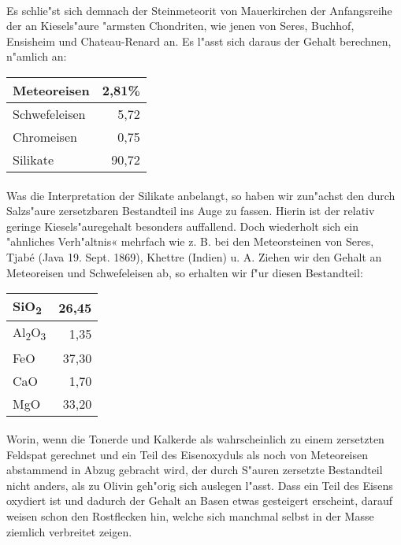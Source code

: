 \documentclass[a4paper, 11pt, oneside]{article}
\begin{document}
\paragraph{}
Es schlie"st sich demnach der Steinmeteorit von Mauerkirchen der Anfangsreihe der an Kiesels"aure "armsten Chondriten, wie jenen von Seres, Buchhof, Ensisheim und Chateau-Renard an. Es l"asst sich daraus der Gehalt berechnen, n"amlich an:
\begin{center}
    \begin{tabular}{ |l|r| } 
    \hline
    Meteoreisen & 2,81\%\\\hline
    Schwefeleisen & 5,72\\\hline
    Chromeisen & 0,75\\\hline
    Silikate & 90,72\\
    \hline
    \end{tabular}
\end{center}
\paragraph{}
Was die Interpretation der Silikate anbelangt, so haben wir zun"achst den durch Salzs"aure zersetzbaren Bestandteil ins Auge zu fassen. Hierin ist der relativ geringe Kiesels"auregehalt besonders auffallend. Doch wiederholt sich ein "ahnliches Verh"altnis« mehrfach wie z. B. bei den Meteorsteinen von Seres, Tjabé (Java 19. Sept. 1869), Khettre (Indien) u. A. Ziehen wir den Gehalt an Meteoreisen und Schwefeleisen ab, so erhalten wir f"ur diesen Bestandteil:
\begin{center}
    \begin{tabular}{ |l|r| } 
    \hline
    SiO\textsubscript{2} & 26,45\\\hline
    Al\textsubscript{2}O\textsubscript{3} & 1,35\\\hline
    FeO & 37,30\\\hline
    CaO & 1,70\\\hline
    MgO & 33,20\\
    \hline
    \end{tabular}
\end{center}
\paragraph{}
Worin, wenn die Tonerde und Kalkerde als wahrscheinlich zu einem zersetzten Feldspat gerechnet und ein Teil des Eisenoxyduls als noch von Meteoreisen abstammend in Abzug gebracht wird, der durch S"auren zersetzte Bestandteil nicht anders, als zu Olivin geh"orig sich auslegen l"asst. Dass ein Teil des Eisens oxydiert ist und dadurch der Gehalt an Basen etwas gesteigert erscheint, darauf weisen schon den Rostflecken hin, welche sich manchmal selbst in der Masse ziemlich verbreitet zeigen.
\end{document}
